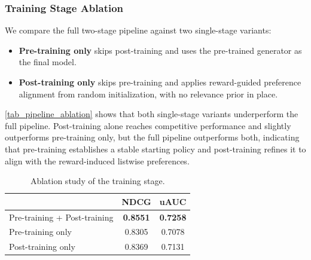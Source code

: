 \documentclass[sigconf]{acmart}
\begin{document}
\subsubsection{Training Stage Ablation}
We compare the full two-stage pipeline against two single-stage variants:
\begin{itemize}
    \item \textbf{Pre-training only} skips post-training and uses the pre-trained generator as the final model.
    \item \textbf{Post-training only} skips pre-training and applies reward-guided preference alignment from random initialization, with no relevance prior in place.
\end{itemize}
\autoref{tab_pipeline_ablation} shows that both single-stage variants underperform the full pipeline. Post-training alone reaches competitive performance and slightly outperforms pre-training only, but the full pipeline outperforms both, indicating that pre-training establishes a stable starting policy and post-training refines it to align with the reward-induced listwise preferences.

\begin{table}[htpb]
\caption{Ablation study of the training stage.}
\label{tab_pipeline_ablation}
\begin{tabular}{lcc}
\toprule
                                   & NDCG            & uAUC            \\
\midrule
Pre-training + Post-training       & \textbf{0.8551} & \textbf{0.7258} \\
\midrule
Pre-training only                  & 0.8305          & 0.7078          \\
Post-training only                 & 0.8369          & 0.7131          \\
\bottomrule
\end{tabular}
\end{table}



\end{document}
